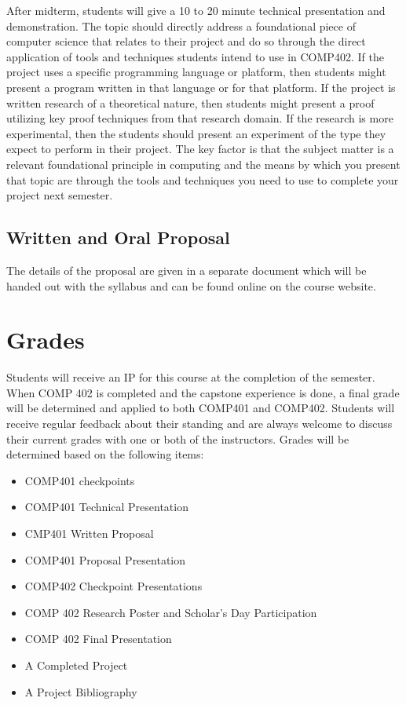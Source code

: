 \documentclass[10pt]{article}
\begin{document}
After midterm, students will give a 10 to 20 minute technical presentation and demonstration. The topic should directly address a foundational piece of computer science that relates to their project and do so through the direct application of tools and techniques students intend to use in COMP402. If the project uses a specific programming language or platform, then students might present a program written in that language or for that platform. If the project is written research of a theoretical nature, then students might present a proof utilizing key proof techniques from that research domain. If the research is more experimental, then the students should present an experiment of the type they expect to perform in their project. The key factor is that the subject matter is a relevant foundational principle in computing and the means by which you present that topic are through the tools and techniques you need to use to complete your project next semester.


\subsection{Written and Oral Proposal}

The details of the proposal are given in a separate document which will be handed out with the syllabus and can be found online on the course website.

\section{Grades}

Students will receive an IP for this course at the completion of the semester. When COMP 402 is completed and the capstone experience is done, a final grade will be determined and applied to both COMP401 and COMP402. Students will receive regular feedback about their standing and are always welcome to discuss their current grades with one or both of the instructors. Grades will be determined based on the following items:
\begin{itemize}
\item COMP401 checkpoints
\item COMP401 Technical Presentation
\item CMP401 Written Proposal
\item COMP401 Proposal Presentation
\item COMP402 Checkpoint Presentations
\item COMP 402 Research Poster and Scholar's Day Participation
\item COMP 402 Final Presentation
\item A Completed Project
\item A Project Bibliography
\end{itemize}
\end{document}
